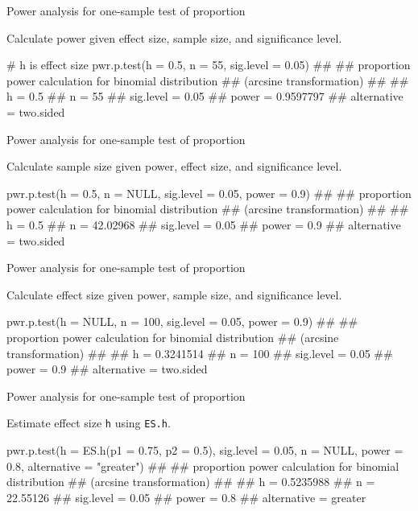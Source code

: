 \documentclass[12pt, t, xcolor=dvipsnames]{beamer}
\newcommand{\code}[1]{\colorbox{codegray}{\textcolor{black!95}{\texttt{#1}}}}
\begin{document}
\begin{frame}[fragile]{Power analysis for one-sample test of proportion}

Calculate power given effect size, sample size, and significance level.

\begin{Rcode}
# h is effect size
pwr.p.test(h = 0.5, n = 55, sig.level = 0.05)
## 
##      proportion power calculation for binomial distribution 
##      (arcsine transformation) 
## 
##               h = 0.5
##               n = 55
##       sig.level = 0.05
##           power = 0.9597797
##     alternative = two.sided
\end{Rcode}

\end{frame}



\begin{frame}[fragile]{Power analysis for one-sample test of proportion}

Calculate sample size given power, effect size, and significance level.

\begin{Rcode}
pwr.p.test(h = 0.5, n = NULL, sig.level = 0.05, power = 0.9)
## 
##      proportion power calculation for binomial distribution 
##      (arcsine transformation) 
## 
##               h = 0.5
##               n = 42.02968
##       sig.level = 0.05
##           power = 0.9
##     alternative = two.sided
\end{Rcode}

\end{frame}

\begin{frame}[fragile]{Power analysis for one-sample test of proportion}

Calculate effect size given power, sample size, and significance level.

\begin{Rcode}
pwr.p.test(h = NULL, n = 100, sig.level = 0.05, power = 0.9)
## 
##      proportion power calculation for binomial distribution 
##      (arcsine transformation) 
## 
##               h = 0.3241514
##               n = 100
##       sig.level = 0.05
##           power = 0.9
##     alternative = two.sided
\end{Rcode}

\end{frame}

\begin{frame}[fragile]{Power analysis for one-sample test of proportion}

Estimate effect size \code{h} using \code{ES.h}. 

\begin{Rcode}
pwr.p.test(h = ES.h(p1 = 0.75, p2 = 0.5), sig.level = 0.05, 
           n = NULL, power = 0.8, 
           alternative = "greater")
## 
##      proportion power calculation for binomial distribution 
##      (arcsine transformation) 
## 
##               h = 0.5235988
##               n = 22.55126
##       sig.level = 0.05
##           power = 0.8
##     alternative = greater
\end{Rcode}

\end{frame}
\end{document}
